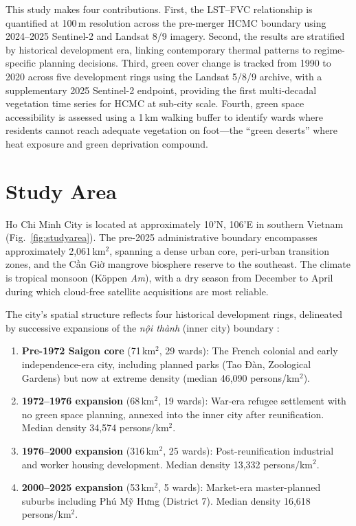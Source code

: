 \documentclass[preprint,12pt]{elsarticle}
\begin{document}
This study makes four contributions. First, the LST--FVC relationship is quantified at 100\,m resolution across the pre-merger HCMC boundary using 2024--2025 Sentinel-2 and Landsat 8/9 imagery. Second, the results are stratified by historical development era, linking contemporary thermal patterns to regime-specific planning decisions. Third, green cover change is tracked from 1990 to 2020 across five development rings using the Landsat 5/8/9 archive, with a supplementary 2025 Sentinel-2 endpoint, providing the first multi-decadal vegetation time series for HCMC at sub-city scale. Fourth, green space accessibility is assessed using a 1\,km walking buffer to identify wards where residents cannot reach adequate vegetation on foot---the ``green deserts'' where heat exposure and green deprivation compound.

\section{Study Area}
\label{sec:study_area}

Ho Chi Minh City is located at approximately 10'N, 106'E in southern Vietnam (Fig.~\ref{fig:studyarea}). The pre-2025 administrative boundary encompasses approximately 2,061\,km$^2$, spanning a dense urban core, peri-urban transition zones, and the Cần Giờ mangrove biosphere reserve to the southeast. The climate is tropical monsoon (Köppen \textit{Am}), with a dry season from December to April during which cloud-free satellite acquisitions are most reliable.

The city's spatial structure reflects four historical development rings, delineated by successive expansions of the \textit{nội thành} (inner city) boundary \citep{waibel2006}:

\begin{enumerate}
    \item \textbf{Pre-1972 Saigon core} (71\,km$^2$, 29 wards): The French colonial and early independence-era city, including planned parks (Tao Đàn, Zoological Gardens) but now at extreme density (median 46,090 persons/km$^2$).
    \item \textbf{1972--1976 expansion} (68\,km$^2$, 19 wards): War-era refugee settlement with no green space planning, annexed into the inner city after reunification. Median density 34,574 persons/km$^2$.
    \item \textbf{1976--2000 expansion} (316\,km$^2$, 25 wards): Post-reunification industrial and worker housing development. Median density 13,332 persons/km$^2$.
    \item \textbf{2000--2025 expansion} (53\,km$^2$, 5 wards): Market-era master-planned suburbs including Phú Mỹ Hưng (District 7). Median density 16,618 persons/km$^2$.
\end{enumerate}
\end{document}
